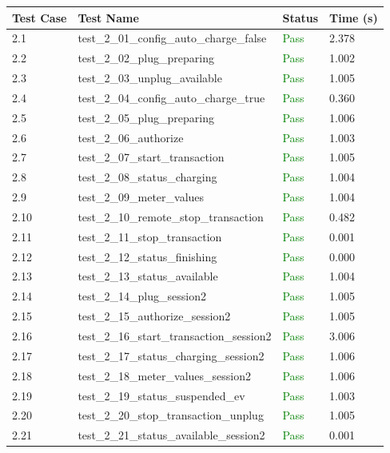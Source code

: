 \documentclass{article}
\begin{document}
\begin{longtable}{p{} p{} p{} p{}}
\toprule
\textbf{Test Case} & \textbf{Test Name} & \textbf{Status} & \textbf{Time (s)} \\
\midrule
\endhead
2.1 & test\_2\_01\_config\_auto\_charge\_false & \textcolor{green}{Pass} & 2.378 \\
2.2 & test\_2\_02\_plug\_preparing & \textcolor{green}{Pass} & 1.002 \\
2.3 & test\_2\_03\_unplug\_available & \textcolor{green}{Pass} & 1.005 \\
2.4 & test\_2\_04\_config\_auto\_charge\_true & \textcolor{green}{Pass} & 0.360 \\
2.5 & test\_2\_05\_plug\_preparing & \textcolor{green}{Pass} & 1.006 \\
2.6 & test\_2\_06\_authorize & \textcolor{green}{Pass} & 1.003 \\
2.7 & test\_2\_07\_start\_transaction & \textcolor{green}{Pass} & 1.005 \\
2.8 & test\_2\_08\_status\_charging & \textcolor{green}{Pass} & 1.004 \\
2.9 & test\_2\_09\_meter\_values & \textcolor{green}{Pass} & 1.004 \\
2.10 & test\_2\_10\_remote\_stop\_transaction & \textcolor{green}{Pass} & 0.482 \\
2.11 & test\_2\_11\_stop\_transaction & \textcolor{green}{Pass} & 0.001 \\
2.12 & test\_2\_12\_status\_finishing & \textcolor{green}{Pass} & 0.000 \\
2.13 & test\_2\_13\_status\_available & \textcolor{green}{Pass} & 1.004 \\
2.14 & test\_2\_14\_plug\_session2 & \textcolor{green}{Pass} & 1.005 \\
2.15 & test\_2\_15\_authorize\_session2 & \textcolor{green}{Pass} & 1.005 \\
2.16 & test\_2\_16\_start\_transaction\_session2 & \textcolor{green}{Pass} & 3.006 \\
2.17 & test\_2\_17\_status\_charging\_session2 & \textcolor{green}{Pass} & 1.006 \\
2.18 & test\_2\_18\_meter\_values\_session2 & \textcolor{green}{Pass} & 1.006 \\
2.19 & test\_2\_19\_status\_suspended\_ev & \textcolor{green}{Pass} & 1.003 \\
2.20 & test\_2\_20\_stop\_transaction\_unplug & \textcolor{green}{Pass} & 1.005 \\
2.21 & test\_2\_21\_status\_available\_session2 & \textcolor{green}{Pass} & 0.001 \\
\bottomrule
\end{longtable}
\end{document}

